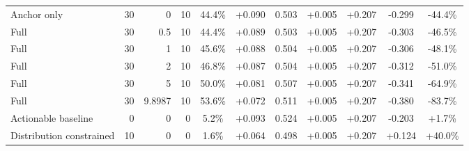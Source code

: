 \begin{table}[htbp]
\begin{tabular}{lrrrccccccc}
Anchor only & 30 & 0 & 10 & 44.4\% & +0.090 & 0.503 & +0.005 & +0.207 & -0.299 & -44.4\% \\
Full & 30 & 0.5 & 10 & 44.4\% & +0.089 & 0.503 & +0.005 & +0.207 & -0.303 & -46.5\% \\
Full & 30 & 1 & 10 & 45.6\% & +0.088 & 0.504 & +0.005 & +0.207 & -0.306 & -48.1\% \\
Full & 30 & 2 & 10 & 46.8\% & +0.087 & 0.504 & +0.005 & +0.207 & -0.312 & -51.0\% \\
Full & 30 & 5 & 10 & 50.0\% & +0.081 & 0.507 & +0.005 & +0.207 & -0.341 & -64.9\% \\
Full & 30 & 9.8987 & 10 & 53.6\% & +0.072 & 0.511 & +0.005 & +0.207 & -0.380 & -83.7\% \\
Actionable baseline & 0 & 0 & 0 & 5.2\% & +0.093 & 0.524 & +0.005 & +0.207 & -0.203 & +1.7\% \\
Distribution constrained & 10 & 0 & 0 & 1.6\% & +0.064 & 0.498 & +0.005 & +0.207 & +0.124 & +40.0\% \\
\bottomrule
\end{tabular}
\end{table}